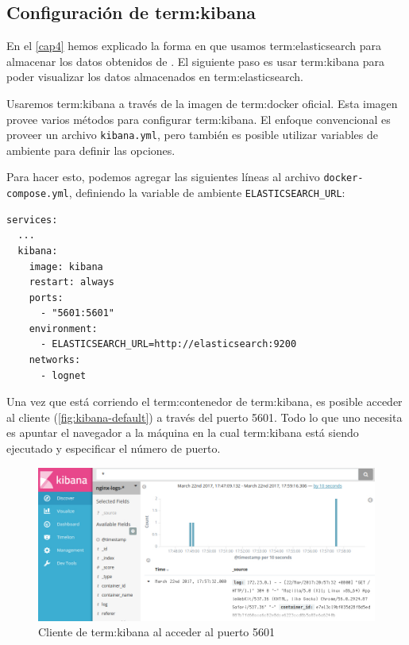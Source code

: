 \subsection{Configuración de \gls{term:kibana}}
\label{configuracion-de-kibana}

En el \autoref{cap4} hemos explicado la forma en que usamos \gls{term:elasticsearch} para
almacenar los datos obtenidos de . El siguiente paso es usar
\gls{term:kibana} para poder visualizar los datos almacenados en
\gls{term:elasticsearch}.

Usaremos \gls{term:kibana} a través de la imagen de \gls{term:docker} oficial.
Esta imagen provee varios métodos para configurar \gls{term:kibana}. El enfoque
convencional es proveer un archivo \texttt{kibana.yml}, pero también es
posible utilizar variables de ambiente para definir las opciones.

Para hacer esto, podemos agregar las siguientes líneas al archivo
\lstinline{docker-compose.yml}, definiendo la variable de ambiente
\lstinline{ELASTICSEARCH_URL}:

\begin{lstlisting}
services:
  ...
  kibana:
    image: kibana
    restart: always
    ports:
      - "5601:5601"
    environment:
      - ELASTICSEARCH_URL=http://elasticsearch:9200
    networks:
      - lognet
\end{lstlisting}

Una vez que está corriendo el \gls{term:contenedor} de \gls{term:kibana}, es posible acceder al
cliente  (\autoref{fig:kibana-default}) a través
del puerto 5601. Todo lo que uno necesita es apuntar el navegador  a la
máquina en la cual \gls{term:kibana} está siendo ejecutado y especificar el
número de puerto.

\begin{figure}
  \includegraphics[width=\linewidth]{src/images/05-capitulo-5/kibanadefault.jpg}
  \caption{Cliente de \gls{term:kibana} al acceder al puerto 5601}
  \label{fig:kibana-default}
\end{figure}

